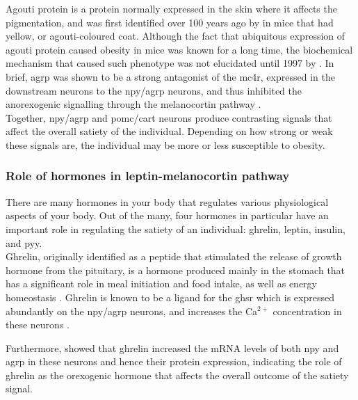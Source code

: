 Agouti protein is a protein normally expressed in the skin where it affects the pigmentation, and was first identified over 100 years ago by \citet{Castle1910} in mice that had yellow, or agouti-coloured coat.
Although the fact that ubiquitous expression of agouti protein caused obesity in mice was known for a long time, the biochemical mechanism that caused such phenotype was not elucidated until 1997 by \citet{Ollmann1997}.
In brief, \gls{agrp} was shown to be a strong antagonist of the \gls{mc4r}, expressed in the downstream neurons to the \gls{npy}/\gls{agrp} neurons, and thus inhibited the anorexogenic signalling through the melanocortin pathway \citep{Barsh2002,Ollmann1997}.\\

\noindent
Together, \gls{npy}/\gls{agrp} and \gls{pomc}/\gls{cart} neurons produce contrasting signals that affect the overall satiety of the individual.
Depending on how strong or weak these signals are, the individual may be more or less susceptible to obesity.

\subsubsection{Role of hormones in leptin-melanocortin pathway}
\label{ssub:role_of_hormones_in_leptin_melanocortin_pathway}

There are many hormones in your body that regulates various physiological aspects of your body.
Out of the many, four hormones in particular have an important role in regulating the satiety of an individual: ghrelin, leptin, insulin, and \gls{pyy}.\\

\noindent
Ghrelin, originally identified as a peptide that stimulated the release of growth hormone from the pituitary, is a hormone produced mainly in the stomach that has a significant role in meal initiation and food intake, as well as energy homeostasis \citep{Kohno2003, Kojima1999, Nakazato2001}.
Ghrelin is known to be a ligand for the \gls{ghsr} which is expressed abundantly on the \gls{npy}/\gls{agrp} neurons, and increases the Ca$^{2+}$ concentration in these neurons \citep{Kohno2003}.

Furthermore, \citet{Seoane2003} showed that ghrelin increased the mRNA levels of both \gls{npy} and \gls{agrp} in these neurons and hence their protein expression, indicating the role of ghrelin as the orexogenic hormone that affects the overall outcome of the satiety signal.
\\

